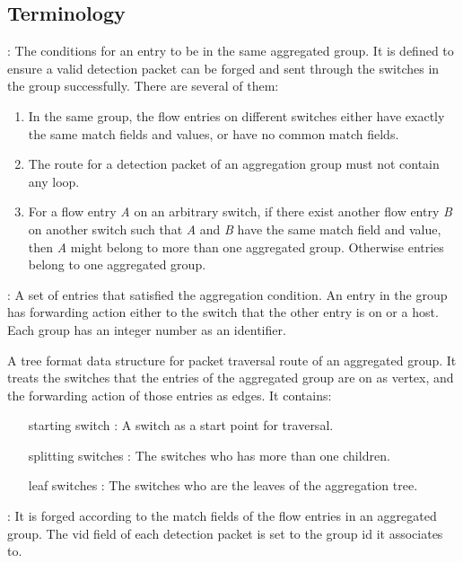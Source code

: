 \subsection{Terminology}

\begin{description}%

\item
[Aggregation conditions]:
The conditions for an entry to be in the same aggregated group. It is defined to ensure a valid detection packet can be forged and sent through the switches in the group successfully. There are several of them:
\begin{enumerate}[label={\arabic*)}]
\item
In the same group, the flow entries on different switches either have exactly the same match fields and values, or have no common match fields.
\item
The route for a detection packet of an aggregation group must not contain any loop.
\item
For a flow entry \textit{A} on an arbitrary switch, if there exist another flow entry \textit{B} on another switch such that \textit{A} and \textit{B} have the same match field and value, then \textit{A} might belong to more than one aggregated group. Otherwise entries belong to one aggregated group.

\end{enumerate}


\item
[Aggregated groups]: 
A set of entries that satisfied the aggregation condition. An entry in the group has forwarding action either to the switch that the other entry is on or a host. Each group has an integer number as an identifier.

\item 
[Aggregation tree]
A tree format data structure for packet traversal route of an aggregated group. It treats the switches that the entries of the aggregated group are on as vertex, and the forwarding action of those entries as edges. It contains:
\begin{enumerate}
\item
[starting switch]:
A switch as a start point for traversal.
\item
[splitting switches]:
The switches who has more than one children. 
\item
[leaf switches]:
The switches who are the leaves of the aggregation tree.
\end{enumerate}
\item 

\item
[Detection packets]:
It is forged according to the match fields of the flow entries in an aggregated group. The vid field of each detection packet is set to the group id it associates to.
\end{description}

